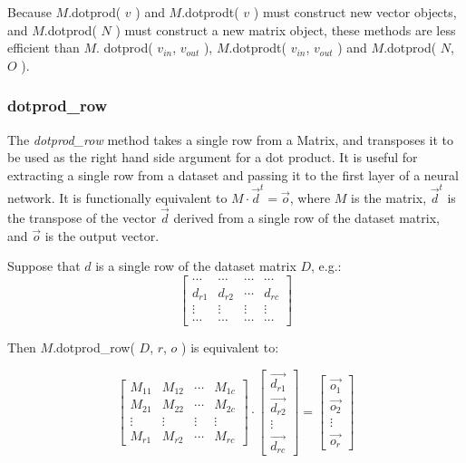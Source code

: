 \documentclass{report}
\begin{document}
Because $M$.dotprod( $v$ ) and $M$.dotprodt( $v$ ) must construct new
vector objects, and $M$.dotprod( $N$ ) must construct a new matrix
object, these methods are less efficient than $M$. dotprod( $v_{in}$,
$v_{out}$ ), $M$.dotprodt( $v_{in}$, $v_{out}$ ) and $M$.dotprod( $N$,
$O$ ).

\subsubsection{dotprod\_row}

The {\em dotprod\_row} method takes a single row from a Matrix, and
transposes it to be used as the right hand side argument for a dot
product.  It is useful for extracting a single row from a dataset and
passing it to the first layer of a neural network.  It is functionally
equivalent to $M \cdot {\vec{d}}^{t} = \vec{o}$, where $M$ is the
matrix, ${\vec{d}}^{t}$ is the transpose of the vector $\vec{d}$
derived
from a single row of the dataset matrix, and $\vec{o}$ is the output
vector.

Suppose that $d$ is a single row of the dataset matrix $D$, e.g.:
\[
\left[ \begin{array}{cccc}
	\cdots & \cdots & \cdots & \cdots \\
	d_{r1} & d_{r2} & \cdots & d_{rc} \\
	\vdots & \vdots & \vdots & \vdots \\
	\cdots & \cdots & \cdots & \cdots
\end{array} \right]
\]

Then $M$.dotprod\_row( $D$, $r$, $o$ ) is equivalent to:

\[
\left[ \begin{array}{cccc}
	M_{11} & M_{12} & \cdots & M_{1c} \\
	M_{21} & M_{22} & \cdots & M_{2c} \\
	\vdots & \vdots & \vdots & \vdots  \\
	M_{r1} & M_{r2} & \cdots & M_{rc}
\end{array} \right]
\cdot
\left[ \begin{array}{c}
	\vec{d_{r1}} \\
	\vec{d_{r2}} \\
	\vdots \\
	\vec{d_{rc}}
\end{array} \right]
=
\left[ \begin{array}{c}
	\vec{o_{1}} \\
	\vec{o_{2}} \\

	\vdots \\
	\vec{o_{r}}
\end{array} \right]
\]
\end{document}

